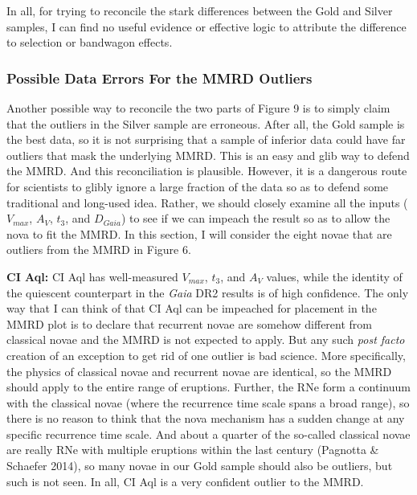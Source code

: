 \documentclass[a4paper,fleqn,usenatbib]{mnras}
\begin{document}
In all, for trying to reconcile the stark differences between the Gold and Silver samples, I can find no useful evidence or effective logic to attribute the difference to selection or bandwagon effects.

\subsubsection{Possible Data Errors For the MMRD Outliers}

Another possible way to reconcile the two parts of Figure 9 is to simply claim that the outliers in the Silver sample are erroneous.  After all, the Gold sample is the best data, so it is not surprising that a sample of inferior data could have far outliers that mask the underlying MMRD.  This is an easy and glib way to defend the MMRD.  And this reconciliation is plausible.  However, it is a dangerous route for scientists to glibly ignore a large fraction of the data so as to defend some traditional and long-used idea.  Rather, we should closely examine all the inputs ($V_{max}$, $A_V$, $t_3$, and $D_{Gaia}$) to see if we can impeach the result so as to allow the nova to fit the MMRD.  In this section, I will consider the eight novae that are outliers from the MMRD in Figure 6.

	{\bf CI Aql:}  CI Aql has well-measured $V_{max}$, $t_3$, and $A_V$ values, while the identity of the quiescent counterpart in the {\it Gaia} DR2 results is of high confidence.  The only way that I can think of that CI Aql can be impeached for placement in the MMRD plot is to declare that recurrent novae are somehow different from classical novae and the MMRD is not expected to apply.  But any such {\it post facto} creation of an exception to get rid of one outlier is bad science.  More specifically, the physics of classical novae and recurrent novae are identical, so the MMRD should apply to the entire range of eruptions.  Further, the RNe form a continuum with the classical novae (where the recurrence time scale spans a broad range), so there is no reason to think that the nova mechanism has a sudden change at any specific recurrence time scale.  And about a quarter of the so-called classical novae are really RNe with multiple eruptions within the last century (Pagnotta \& Schaefer 2014), so many novae in our Gold sample should also be outliers, but such is not seen.  In all, CI Aql is a very confident outlier to the MMRD.
\end{document}
